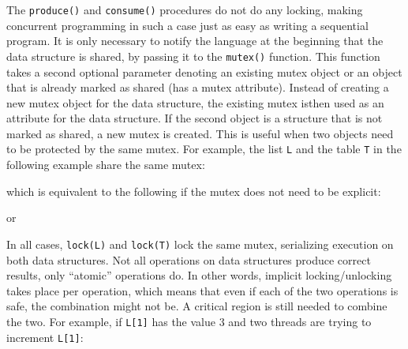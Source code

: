 
The \texttt{produce()} and \texttt{consume()} procedures do not do any locking,
making concurrent programming in such a case just as easy as writing a
sequential program. It is only necessary to notify the language at the beginning
that the data structure is shared, by passing it to the \texttt{mutex()}
function. This function takes a second optional parameter denoting an existing
mutex object or an object that is already marked as shared (has a mutex
attribute).  Instead of creating a new mutex object for the data structure, the
existing mutex isthen used as an attribute for the data structure. If the second
object is a structure that is not marked as shared, a new mutex is created. This
is useful when two objects need to be protected by the same mutex. For example,
the list \texttt{L} and the table \texttt{T} in the following example share the
same mutex:


which is equivalent to the following if the mutex does not need to be explicit:


or


In all cases, \texttt{lock(L)} and \texttt{lock(T)} lock the same mutex,
serializing execution on both data structures. Not all operations on data
structures produce correct results, only ``atomic'' operations do. In other
words, implicit locking/unlocking takes place per operation, which means that
even if each of the two operations is safe, the combination might not be. A
critical region is still needed to combine the two.  For example, if
\texttt{L[1]} has the value 3 and two threads are trying to increment
\texttt{L[1]}:

